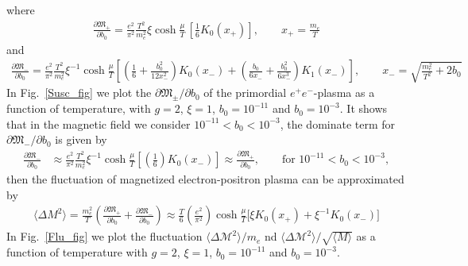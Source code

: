 \documentclass[onecolumn,preprintnumbers,amsmath,amssymb]{revtex4}
\begin{document}
 where 
 \begin{align}
 \frac{\partial {\mathfrak M}_{+} }{\partial b_0}=\frac{e^{2}}{\pi^{2}}\frac{T^{2}}{m_{e}^{2}}\xi\cosh{\frac{\mu}{T}}\,\left[\frac{1}{6}K_{0}(x_{+})\right],\qquad x_{+}=\frac{m_{e}}{T}
 \end{align}
 and 
 \begin{align}
  \frac{\partial {\mathfrak M}_{-} }{\partial b_0}=\frac{e^{2}}{\pi^{2}}\frac{T^{2}}{m_{e}^{2}}\xi^{-1}\cosh{\frac{\mu}{T}}\left[\left(\frac{1}{6}+\frac{b^2_0}{12x^2_{-}}\right)K_0(x_{-})+\left(\frac{b_0}{6x_{-}}+\frac{b^2_0}{6x^3_{-}}\right)K_1(x_{-})\right],\qquad  x_{-}=\sqrt{\frac{m_{e}^{2}}{T^{2}}+2b_{0}}
 \end{align}
In Fig.~\ref{Susc_fig} we plot the $\partial{\mathfrak M}_\pm/\partial b_0$ of the primordial $e^{+}e^{-}$-plasma as a function of temperature, with $g=2$, $\xi=1$, $b_0=10^{-11}$ and $b_0=10^{-3}$. It shows that in the magnetic field we consider $10^{-11}<b_0<10^{-3}$, the dominate term for $\partial{\mathfrak M}_{-}/\partial b_0$ is given by
 \begin{align}
\frac{\partial {\mathfrak M}_{-} }{\partial b_0}&\approx\frac{e^{2}}{\pi^{2}}\frac{T^{2}}{m_{e}^{2}}\xi^{-1}\cosh{\frac{\mu}{T}}\left[\left(\frac{1}{6}\right)K_0(x_{-})\right]\approx \frac{\partial {\mathfrak M}_{+} }{\partial b_0}, \qquad \mathrm{for} \,\,10^{-11}<b_0<10^{-3},
 \end{align}
 then the fluctuation of magnetized electron-positron plasma can be approximated by
 \begin{align}
  \langle\Delta {M}^2\rangle=\frac{m_e^2}{T}\left(\frac{\partial {\mathfrak M}_{+} }{\partial b_0}+\frac{\partial {\mathfrak M} _{-}}{\partial b_0}\right)\approx \frac{T}{6}\left(\frac{e^{2}}{\pi^{2}}\right)\cosh{\frac{\mu}{T}}\bigg[\xi K_0(x_+)+\xi^{-1}K_0(x_{-})\bigg]
 \end{align} 
 In Fig.~\ref{Flu_fig} we plot the fluctuation $ \langle\Delta {\mathcal M}^2\rangle/m_e$ nd  $\langle\Delta {\mathcal M}^2\rangle/\sqrt{\langle M\rangle}$ as a function of temperature with $g=2$,  $\xi=1$, $b_0=10^{-11}$ and $b_0=10^{-3}$.
\end{document}
